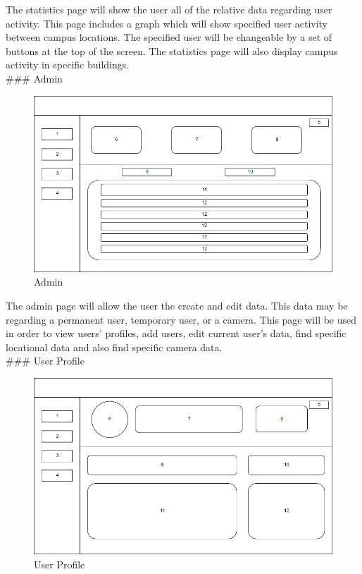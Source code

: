 \documentclass[
  english,
  a4paper,
,tablecaptionabove
]{scrartcl}
\begin{document}
The statistics page will show the user all of the relative data
regarding user activity. This page includes a graph which will show
specified user activity between campus locations. The specified user
will be changeable by a set of buttons at the top of the screen. The
statistics page will also display campus activity in specific
buildings.\\
\newpage \#\#\# Admin

\begin{figure}
\centering
\includegraphics{images/ppm-images/admin-design.png}
\caption{Admin}
\end{figure}

The admin page will allow the user the create and edit data. This data
may be regarding a permanent user, temporary user, or a camera. This
page will be used in order to view users' profiles, add users, edit
current user's data, find specific locational data and also find
specific camera data.\\
\newpage \#\#\# User Profile

\begin{figure}
\centering
\includegraphics{images/ppm-images/profile-design.png}
\caption{User Profile}
\end{figure}
\end{document}
